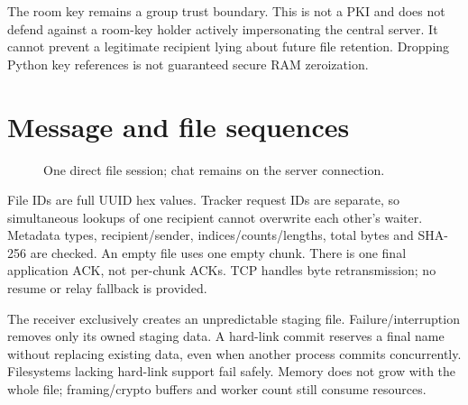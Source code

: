 \documentclass[11pt,a4paper]{article}
\begin{document}
The room key remains a group trust boundary. This is not a PKI and does not defend against a room-key holder actively impersonating the central server. It cannot prevent a legitimate recipient lying about future file retention. Dropping Python key references is not guaranteed secure RAM zeroization.

\section{Message and file sequences}


\begin{figure}[ht]
\centering
{}
\caption{One direct file session; chat remains on the server connection.}
\end{figure}


File IDs are full UUID hex values. Tracker request IDs are separate, so simultaneous lookups of one recipient cannot overwrite each other's waiter. Metadata types, recipient/sender, indices/counts/lengths, total bytes and SHA-256 are checked. An empty file uses one empty chunk. There is one final application ACK, not per-chunk ACKs. TCP handles byte retransmission; no resume or relay fallback is provided.

The receiver exclusively creates an unpredictable staging file. Failure/interruption removes only its owned staging data. A hard-link commit reserves a final name without replacing existing data, even when another process commits concurrently. Filesystems lacking hard-link support fail safely. Memory does not grow with the whole file; framing/crypto buffers and worker count still consume resources.
\end{document}
